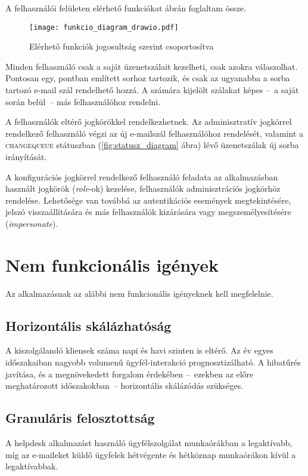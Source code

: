 A felhasználói felületen elérhető funkciókat  ábrán foglaltam össze.

\begin{figure}[hbt] 
	\centering
	\texttt{[image: funkcio\_diagram\_drawio.pdf]}
	\caption[Elérhető funkciók]{Elérhető funkciók jogosultság szerint csoportosítva}
	\label{fig:funkcio_diagram}
\end{figure}


Minden felhasználó csak a saját üzenetszálait kezelheti, csak azokra válaszolhat. Pontosan egy,   pontban említett sorhoz tartozik, és csak az ugyanabba a sorba tartozó e-mail szál rendelhető hozzá. A számára kijelölt szálakat képes --~a saját során belül~-- más felhasználóhoz rendelni. 

A felhasználók eltérő jogkörökkel rendelkezhetnek. Az adminisztratív jogkörrel rendelkező felhasználó végzi az új e-mailszál felhasználóhoz rendelését, valamint a \foreignlanguage{british}{\textsc{change\textunderscore queue}} státuszban (\ref{fig:statusz_diagram} ábra) lévő üzenetszálak új sorba irányítását.


A konfigurációs jogkörrel rendelkező felhasználó feladata az alkalmazásban használt jogkörök (\foreignlanguage{british}{\emph{role}}-ok) kezelése, felhasználók adminisztrációs jogkörhöz rendelése. Lehetősége van továbbá az autentikációs események megtekintésére, jelszó visszaállítására és más felhasználók kizárására vagy megszemélyesítésére (\foreignlanguage{british}{\emph{impersonate}}).


\section{Nem funkcionális igények}
Az alkalmazásnak az alábbi nem funkcionális igényeknek kell megfelelnie.
	

\subsection[Skálázhatóság]{Horizontális skálázhatóság}
A kiszolgálandó kliensek száma napi és havi szinten is eltérő. Az év egyes időszakaiban nagyobb volumenű ügyfél-interakció prognosztizálható. A hibatűrés javítása, és a megnövekedett forgalom érdekében --~ezekben az előre meghatározott időszakokban~--  horizontális skálázódás szükséges.


\subsection{Granuláris felosztottság}\label{sec:granularitas}
A \foreignlanguage{british}{helpdesk} alkalmazást használó ügyfélszolgálat munkaórákban a legaktívabb, míg az e-maileket küldő ügyfelek hétvégente és hétköznap munkaórákon kívül a legaktívabbak.

